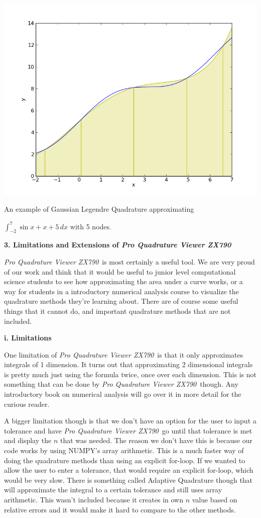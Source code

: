 \documentclass[12pt]{article}
\newcommand{\newLine}{\vspace{5mm}}
\newcommand{\appname}{\textit{Pro Quadrature Viewer ZX790}}
\newcommand{\nextsection}[1]{\newpage\noindent\Large\textbf{#1}\vspace{10mm}\normalsize}
\newcommand{\nextsubsection}[1]{\newLine \noindent \large \textbf{#1} \normalsize}
\newcommand{\integral}[3]{\text{$\int^{#2}_{#1} #3\,dx$}}
\begin{document}
\begin{center}
\includegraphics[scale=0.5]{sinXplusXgaussian.png}

\small An example of Gaussian Legendre Quadrature approximating 

$\integral{-2}{7}{\sin{x}+x+5}$ with 5 nodes. \normalsize
\end{center}

\nextsection{3. Limitations and Extensions of \appname}

\appname\, is most certainly a useful tool. We are very proud of our work and think that it would be useful to junior level computational science students to see how approximating the area under a curve works, or a way for students in a introductory numerical analysis course to visualize the quadrature methods they're learning about. There are of course some useful things that it cannot do, and important quadrature methods that are not included.

\nextsubsection{i. Limitations}

\newLine One limitation of \appname\,  is that it only approximates integrals of 1 dimension. It turns out that approximating 2 dimensional integrals is pretty much just using the formula twice, once over each dimension. This is not something that can be done by \appname\, though. Any introductory book on numerical analysis will go over it in more detail for the curious reader.

\newLine A bigger limitation though is that we don't have an option for the user to input a tolerance and have \appname\, go until that tolerance is met and display the $n$ that was needed. The reason we don't have this is because our code works by using NUMPY's array arithmetic. This is a much faster way of doing the quadrature methods than using an explicit for-loop. If we wanted to allow the user to enter a tolerance, that would require an explicit for-loop, which would be very slow. There is something called Adaptive Quadrature though that will approximate the integral to a certain tolerance and still uses array arithmetic. This wasn't included because it creates in own $n$ value based on relative errors and it would make it hard to compare to the other methods.
\end{document}

